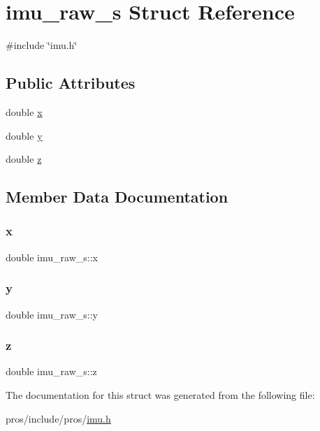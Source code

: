 \hypertarget{structimu__raw__s}{}\section{imu\+\_\+raw\+\_\+s Struct Reference}
\label{structimu__raw__s}


{\ttfamily \#include \char`\"{}imu.\+h\char`\"{}}

\subsection*{Public Attributes}
\begin{DoxyCompactItemize}
\item 
double \hyperlink{structimu__raw__s_ae89e3c1589ae0fe0f58e881b5b5abe0d}{x}
\item 
double \hyperlink{structimu__raw__s_a22be518c9f5925fdde807811013fa778}{y}
\item 
double \hyperlink{structimu__raw__s_a939f61108459fad036af0fada56daa3e}{z}
\end{DoxyCompactItemize}


\subsection{Member Data Documentation}
\mbox{\label{structimu__raw__s_ae89e3c1589ae0fe0f58e881b5b5abe0d}} 
\subsubsection{\texorpdfstring{x}{x}}
{\footnotesize\ttfamily double imu\+\_\+raw\+\_\+s\+::x}

\mbox{\label{structimu__raw__s_a22be518c9f5925fdde807811013fa778}} 
\subsubsection{\texorpdfstring{y}{y}}
{\footnotesize\ttfamily double imu\+\_\+raw\+\_\+s\+::y}

\mbox{\label{structimu__raw__s_a939f61108459fad036af0fada56daa3e}} 
\subsubsection{\texorpdfstring{z}{z}}
{\footnotesize\ttfamily double imu\+\_\+raw\+\_\+s\+::z}



The documentation for this struct was generated from the following file\+:\begin{DoxyCompactItemize}
\item 
pros/include/pros/\hyperlink{imu_8h}{imu.\+h}\end{DoxyCompactItemize}
